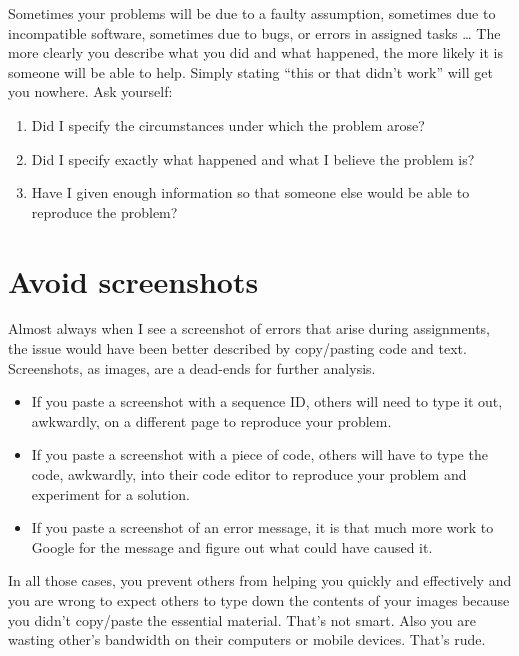 \documentclass[]{book}
\providecommand{\tightlist}{%
  \setlength{\itemsep}{0pt}\setlength{\parskip}{0pt}}
\begin{document}
Sometimes your problems will be due to a faulty assumption, sometimes
due to incompatible software, sometimes due to bugs, or errors in
assigned tasks \ldots{} The more clearly you describe what you did and
what happened, the more likely it is someone will be able to help.
Simply stating ``this or that didn't work'' will get you nowhere. Ask
yourself:

\begin{enumerate}
\def\labelenumi{\arabic{enumi}.}
\tightlist
\item
  Did I specify the circumstances under which the problem arose?
\item
  Did I specify exactly what happened and what I believe the problem is?
\item
  Have I given enough information so that someone else would be able to
  reproduce the problem?
\end{enumerate}

\section{Avoid screenshots}\label{avoid-screenshots}

Almost always when I see a screenshot of errors that arise during
assignments, the issue would have been better described by copy/pasting
code and text. Screenshots, as images, are a dead-ends for further
analysis.

\begin{itemize}
\tightlist
\item
  If you paste a screenshot with a sequence ID, others will need to type
  it out, awkwardly, on a different page to reproduce your problem.
\item
  If you paste a screenshot with a piece of code, others will have to
  type the code, awkwardly, into their code editor to reproduce your
  problem and experiment for a solution.
\item
  If you paste a screenshot of an error message, it is that much more
  work to Google for the message and figure out what could have caused
  it.
\end{itemize}

In all those cases, you prevent others from helping you quickly and
effectively and you are wrong to expect others to type down the contents
of your images because you didn't copy/paste the essential material.
That's not smart. Also you are wasting other's bandwidth on their
computers or mobile devices. That's rude.
\end{document}
